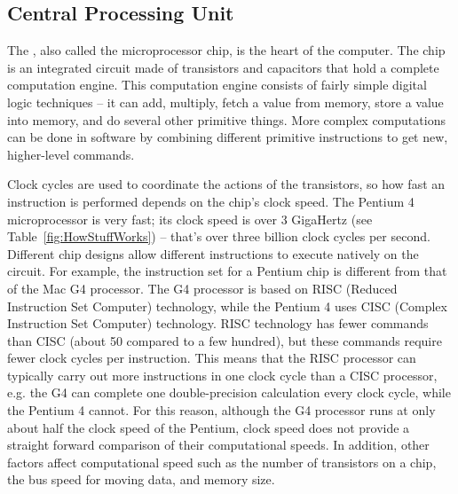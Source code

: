 \subsection{Central Processing Unit} The , also called the
microprocessor chip, is the heart of the computer.  The chip is an
integrated circuit made of transistors and capacitors that hold a
complete computation engine.  This computation engine consists of
fairly simple digital logic techniques -- it can add, multiply, fetch
a value from memory, store a value into memory, and do several other
primitive things.  More complex computations can be done in software
by combining different primitive instructions to get new, higher-level
commands.

Clock cycles are used to coordinate the actions of the transistors, so
how fast an instruction is performed depends on the chip's clock
speed. The Pentium 4 microprocessor is very fast; its clock speed is
over 3 GigaHertz (see Table~\ref{fig:HowStuffWorks}) -- that's over
three billion clock cycles per second.  Different chip designs allow
different instructions to execute natively on the circuit.  For
example, the instruction set for a Pentium chip is different from that
of the Mac G4 processor.  The G4 processor is based on RISC (Reduced
Instruction Set Computer) technology, while the Pentium 4 uses CISC
(Complex Instruction Set Computer) technology.  RISC technology has
fewer commands than CISC (about 50 compared to a few hundred), but
these commands require fewer clock cycles per instruction. This means
that the RISC processor can typically carry out more instructions in
one clock cycle than a CISC processor, e.g. the G4 can complete one
double-precision calculation every clock cycle, while the Pentium 4
cannot.  For this reason, although the G4 processor runs at only about
half the clock speed of the Pentium, clock speed does not provide a
straight forward comparison of their computational speeds.  In
addition, other factors affect computational speed such as the number
of transistors on a chip, the bus speed for moving data, and memory
size.




